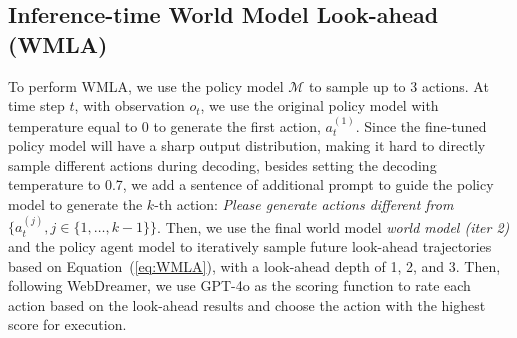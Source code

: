 \documentclass[11pt]{article}
\begin{document}
\subsection{Inference-time World Model Look-ahead (WMLA)}

To perform WMLA, we use the policy model $\mathcal{M}$ to sample up to 3 actions. 
At time step $t$, with observation $o_t$,
we use the original policy model with temperature equal to 0 to generate the first action, $a_t^{(1)}$.
Since the fine-tuned policy model will have a sharp output distribution, making it hard to directly sample different actions during decoding, besides setting the decoding temperature to 0.7, we add a sentence of additional prompt to guide the policy model to generate the $k$-th action: \textit{Please generate actions different from} $\{a_t^{(j)}, j \in \{1, \dots, k-1\}\}$.
Then, we use the final world model \textit{world model (iter 2)} and the policy agent model to iteratively sample future look-ahead trajectories based on Equation~(\ref{eq:WMLA}), with a look-ahead depth of 1, 2, and 3.
Then, following WebDreamer, we use GPT-4o as the scoring function to rate each action based on the look-ahead results and choose the action with the highest score for execution.
\end{document}
